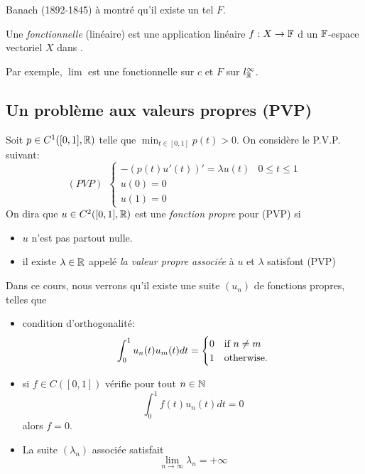     Banach (1892-1845) à montré qu'il existe un tel $F$.

    \begin{definition}
        Une \emph{fonctionnelle} (linéaire) est une application
        linéaire $f: X \to \mathbb F$ d
        un $\mathbb F$-espace vectoriel $X$ dans \F.
    \end{definition}
    
    Par exemple, $\lim$ est une fonctionnelle sur $c$
    et $F$ sur $l^\infty_\mathbb R$.

    \subsection{Un problème aux valeurs propres (PVP)}

    Soit $p \in C^1([0, 1], \mathbb R)$  telle que $\min_{t \in [0, 1]} p(t) > 0$.
    On considère le P.V.P. suivant:
    \[
        (PVP) ~~ \begin{cases} 
            - (p(t)u'(t))' = \lambda u(t) & 0 \leq t \leq 1 \\
            u(0) = 0 \\
            u(1) = 0
        \end{cases} 
    \]
    On dira que $u \in C^2([0, 1], \mathbb R)$ est une \emph{fonction propre}
    pour (PVP) si \begin{itemize}
        \item $u$ n'est pas partout nulle.
        \item il existe $\lambda \in \mathbb R$ appelé \emph{la valeur propre associée}
            à $u$ et $\lambda$ satisfont (PVP)
    \end{itemize}

    Dans ce cours, nous verrons qu'il existe une suite $(u_n)$ de fonctions
    propres, telles que \begin{itemize}
        \item condition d'orthogonalité: \[
            \int_0^1 u_n(t) u_m(t) dt = \begin{cases} 
                0 & \text{if } n \neq m \\
                1 & \text{otherwise}.
             \end{cases} 
        \]
        \item si $f \in C([0, 1])$ vérifie pour tout $n \in \mathbb N$
             \[
                 \int_0^1 f(t) u_n(t) dt = 0
            \]
            alors $f = 0$.
        \item La suite $(\lambda_n)$ associée satisfait
             \[
                 \lim_{n \to \infty} \lambda_n = +\infty
             \]
    \end{itemize}

